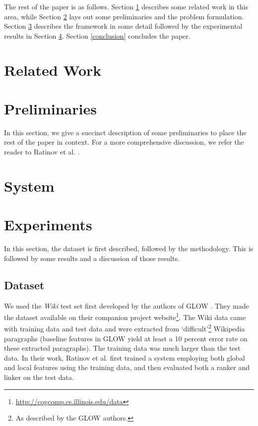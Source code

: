 \documentclass[runningheads,a4paper]{llncs}
\begin{document}
The rest of the paper is as follows. Section \ref{related} describes some related work in this area, while Section \ref{prelim} lays out some preliminaries and the problem formulation. Section \ref{system} describes the framework in some detail followed by the experimental results in Section \ref{experiments}. Section \ref{conclusion} concludes the paper.

 
\section{Related Work}\label{related}


\section{Preliminaries}\label{prelim}
In this section, we give a succinct description of some preliminaries to place the rest of the paper in context. For a more comprehensive discussion, we refer the reader to Ratinov et al. \cite{roth}. 


\section{System}\label{system}


\section{Experiments}\label{experiments}

In this section, the dataset is first described, followed by the methodology. This is followed by some results and a discussion of those results. 
\subsection{Dataset}

We used the \emph{Wiki} test set first developed by the authors of GLOW \cite{roth}. They made the dataset available on their companion project website\footnote{\url{http://cogcomp.cs.illinois.edu/data}}. The Wiki data came with training data and test data and were extracted from `difficult'\footnote{As described by the GLOW authors.} Wikipedia paragraphs (baseline features in GLOW yield at least a 10 percent error rate on these extracted paragraphs). The training data was much larger than the test data. In their work, Ratinov et al. first trained a system employing both global and local features using the training data, and then evaluated both a ranker and linker on the test data. 
\end{document}
